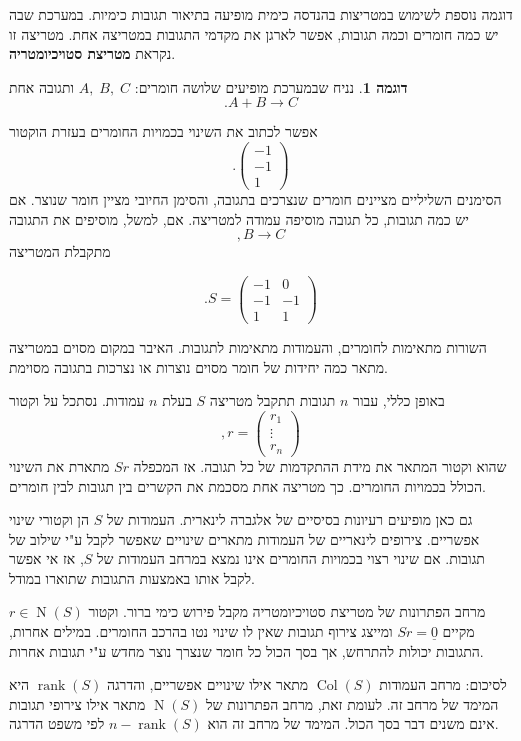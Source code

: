 \documentclass[12pt]{report}
\theoremstyle{plain}
\theoremstyle{definition}
\newtheorem{example}{דוגמה}[chapter]
\DeclareMathOperator{\rank}{rank}
\newcommand{\0}{\mathbf{0}}
\DeclareMathOperator{\Col}{Col}
\DeclareMathOperator{\Null}{N}
\begin{document}
דוגמה נוספת לשימוש במטריצות בהנדסה כימית מופיעה בתיאור תגובות כימיות.
במערכת שבה יש כמה חומרים וכמה תגובות, אפשר לארגן את מקדמי התגובות במטריצה אחת.
מטריצה זו נקראת \textbf{מטריצת סטויכיומטריה}.

\begin{example}
נניח שבמערכת מופיעים שלושה חומרים:
$A,\; B,\; C$
ותגובה אחת
$$
.A+B \longrightarrow C
$$

אפשר לכתוב את השינוי בכמויות החומרים בעזרת הוקטור
$$
.\begin{pmatrix}
-1 \\
-1 \\
1
\end{pmatrix}
$$
הסימנים השליליים מציינים חומרים שנצרכים בתגובה, והסימן החיובי מציין חומר שנוצר. אם יש כמה תגובות, כל תגובה מוסיפה עמודה למטריצה. אם, למשל, מוסיפים את התגובה
$$
,B \longrightarrow C
$$
מתקבלת המטריצה

$$
.S =
\begin{pmatrix}
-1 & 0 \\
-1 & -1 \\
1 & 1
\end{pmatrix}
$$

השורות מתאימות לחומרים, והעמודות מתאימות לתגובות.
האיבר במקום מסוים במטריצה מתאר כמה יחידות של חומר מסוים נוצרות או נצרכות בתגובה מסוימת.
\end{example}

באופן כללי, עבור 
$n$
תגובות תתקבל מטריצה
$S$
בעלת 
$n$
עמודות. נסתכל על וקטור
$$
,r =
\begin{pmatrix}
r_1 \\
\vdots \\
r_n
\end{pmatrix}
$$
שהוא וקטור המתאר את מידת ההתקדמות של כל תגובה. אז המכפלה
$Sr$
מתארת את השינוי הכולל בכמויות החומרים. כך מטריצה אחת מסכמת את הקשרים בין תגובות לבין חומרים.

גם כאן מופיעים רעיונות בסיסיים של אלגברה לינארית.
העמודות של
$S$
הן וקטורי שינוי אפשריים.
צירופים לינאריים של העמודות מתארים שינויים שאפשר לקבל ע"י שילוב של תגובות.
אם שינוי רצוי בכמויות החומרים אינו נמצא במרחב העמודות של
$S$,
אז אי אפשר לקבל אותו באמצעות התגובות שתוארו במודל.

מרחב הפתרונות של מטריצת סטויכיומטריה מקבל פירוש כימי ברור.
וקטור
$r\in\Null(S)$
מקיים
$Sr=\underline{0}$
ומייצג צירוף תגובות שאין לו שינוי נטו בהרכב החומרים. במילים אחרות, התגובות יכולות להתרחש, אך בסך הכול כל חומר שנצרך נוצר מחדש ע"י תגובות אחרות.

לסיכום: מרחב העמודות
$\Col(S)$
מתאר אילו שינויים אפשריים, והדרגה
$\rank(S)$
היא המימד של מרחב זה. לעומת זאת, מרחב הפתרונות של
$\Null(S)$
מתאר אילו צירופי תגובות אינם משנים דבר בסך הכול. המימד של מרחב זה הוא
$n-\rank(S)$
לפי משפט הדרגה.
\end{document}
